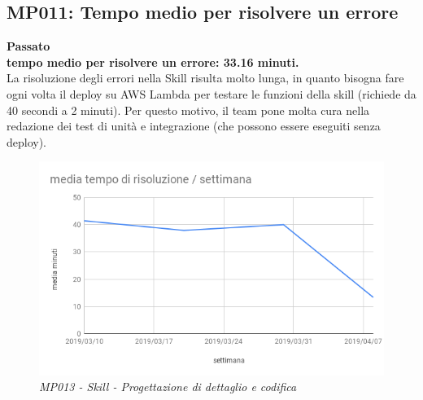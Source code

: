 \subsection{MP011: Tempo medio per risolvere un errore} 
\textbf{Passato}\\
\textbf{tempo medio per risolvere un errore: 33.16 minuti.}\\
La risoluzione degli errori nella Skill risulta molto lunga, in quanto bisogna fare ogni volta il deploy su AWS Lambda per testare le funzioni della skill (richiede da 40 secondi a 2 minuti). Per questo motivo, il team pone molta cura nella redazione dei test di unità e integrazione (che possono essere eseguiti senza deploy).
\begin{figure} [H]
    \centering
	\includegraphics[scale=0.5]{./images/risPDC.png}
    \caption{\textit{MP013 - Skill - Progettazione di dettaglio e codifica}}\label{}
\end{figure}

